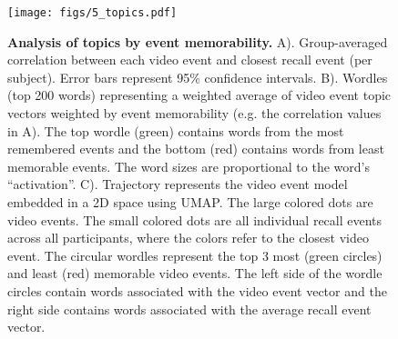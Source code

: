 \documentclass{article}
\begin{document}
{\begin{figure}[t!]
\centering
\texttt{[image: figs/5\_topics.pdf]}
\caption{\small \textbf{Analysis of topics by event memorability.} A). Group-averaged correlation between each video event and closest recall event (per subject). Error bars represent 95\% confidence intervals. B). Wordles (top 200 words) representing a weighted average of video event topic vectors weighted by event memorability (e.g. the correlation values in A). The top wordle (green) contains words from the most remembered events and the bottom (red) contains words from least memorable events. The word sizes are proportional to the word's ``activation''. C). Trajectory represents the video event model embedded in a 2D space using UMAP. The large colored dots are video events. The small colored dots are all individual recall events across all participants, where the colors refer to the closest video event. The circular wordles represent the top 3 most (green circles) and least (red) memorable video events.  The left side of the wordle circles contain words associated with the video event vector and the right side contains words associated with the average recall event vector.}
\label{fig:topics}
\end{figure}


}
\end{document}
